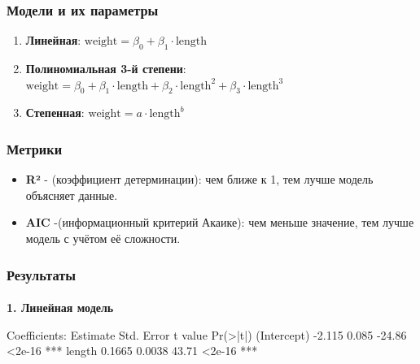 \documentclass[
  letterpaper,
  DIV=11,
  numbers=noendperiod]{scrreprt}
\makeatletter
\let\oldparagraph\paragraph
\renewcommand{\paragraph}{
    \@ifstar
      \xxxParagraphStar
      \xxxParagraphNoStar
  }
\newcommand{\xxxParagraphStar}[1]{\oldparagraph*{#1}\mbox{}}
\newcommand{\xxxParagraphNoStar}[1]{\oldparagraph{#1}\mbox{}}
\newenvironment{Shaded}{\begin{snugshade}}{\end{snugshade}}
\newcommand{\ErrorTok}[1]{\textcolor[rgb]{0.68,0.00,0.00}{#1}}
\newcommand{\FloatTok}[1]{\textcolor[rgb]{0.68,0.00,0.00}{#1}}
\newcommand{\FunctionTok}[1]{\textcolor[rgb]{0.28,0.35,0.67}{#1}}
\newcommand{\NormalTok}[1]{\textcolor[rgb]{0.00,0.23,0.31}{#1}}
\newcommand{\SpecialCharTok}[1]{\textcolor[rgb]{0.37,0.37,0.37}{#1}}
\providecommand{\tightlist}{%
  \setlength{\itemsep}{0pt}\setlength{\parskip}{0pt}}
\makeatother
\begin{document}
\subsubsection{Модели и их
параметры}\label{ux43cux43eux434ux435ux43bux438-ux438-ux438ux445-ux43fux430ux440ux430ux43cux435ux442ux440ux44b}

\begin{enumerate}
\def\labelenumi{\arabic{enumi}.}
\tightlist
\item
  \textbf{Линейная}:
  \(\text{weight} = \beta_0 + \beta_1\cdot\text{length}\)
\item
  \textbf{Полиномиальная 3-й степени}:
  \(\text{weight} = \beta_0 + \beta_1\cdot\text{length} + \beta_2\cdot\text{length}^2 + \beta_3\cdot\text{length}^3\)
\item
  \textbf{Степенная}: \(\text{weight} = a\cdot\text{length}^b\)
\end{enumerate}

\subsubsection{Метрики}\label{ux43cux435ux442ux440ux438ux43aux438}

\begin{itemize}
\tightlist
\item
  \textbf{R²} - (коэффициент детерминации): чем ближе к 1, тем лучше
  модель объясняет данные.
\item
  \textbf{AIC} -(информационный критерий Акаике): чем меньше значение,
  тем лучше модель с учётом её сложности.
\end{itemize}

\subsubsection{\texorpdfstring{\textbf{Результаты}}{Результаты}}\label{ux440ux435ux437ux443ux43bux44cux442ux430ux442ux44b}

\paragraph{\texorpdfstring{\textbf{1. Линейная
модель}}{1. Линейная модель}}\label{ux43bux438ux43dux435ux439ux43dux430ux44f-ux43cux43eux434ux435ux43bux44c}

\begin{Shaded}
\begin{Highlighting}[]
\NormalTok{Coefficients}\SpecialCharTok{:}
\NormalTok{             Estimate Std. Error t value }\FunctionTok{Pr}\NormalTok{(}\SpecialCharTok{\textgreater{}}\ErrorTok{|}\NormalTok{t}\SpecialCharTok{|}\NormalTok{)    }
\NormalTok{(Intercept) }\SpecialCharTok{{-}}\FloatTok{2.115}      \FloatTok{0.085}     \SpecialCharTok{{-}}\FloatTok{24.86}   \SpecialCharTok{\textless{}}\FloatTok{2e{-}16} \SpecialCharTok{**}\ErrorTok{*}
\NormalTok{length       }\FloatTok{0.1665}     \FloatTok{0.0038}    \FloatTok{43.71}    \SpecialCharTok{\textless{}}\FloatTok{2e{-}16} \SpecialCharTok{**}\ErrorTok{*}
\end{Highlighting}
\end{Shaded}
\end{document}
